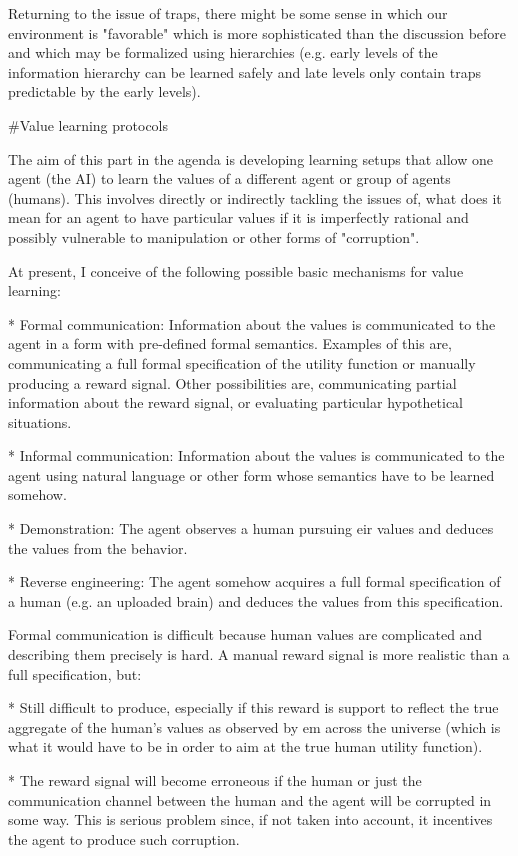 \documentclass[a4paper]{article}
\begin{document}
Returning to the issue of traps, there might be some sense in which our environment is "favorable" which is more sophisticated than the discussion before and which may be formalized using hierarchies (e.g. early levels of the information hierarchy can be learned safely and late levels only contain traps predictable by the early levels).

\#Value learning protocols

The aim of this part in the agenda is developing learning setups that allow one agent (the AI) to learn the values of a different agent or group of agents (humans). This involves directly or indirectly tackling the issues of, what does it mean for an agent to have particular values if it is imperfectly rational and possibly vulnerable to manipulation or other forms of "corruption".

At present, I conceive of the following possible basic mechanisms for value learning:

* Formal communication: Information about the values is communicated to the agent in a form with pre-defined formal semantics. Examples of this are, communicating a full formal specification of the utility function or manually producing a reward signal. Other possibilities are, communicating partial information about the reward signal, or evaluating particular hypothetical situations.

* Informal communication: Information about the values is communicated to the agent using natural language or other form whose semantics have to be learned somehow.

* Demonstration: The agent observes a human pursuing eir values and deduces the values from the behavior.

* Reverse engineering: The agent somehow acquires a full formal specification of a human (e.g. an uploaded brain) and deduces the values from this specification.

Formal communication is difficult because human values are complicated and describing them precisely is hard. A manual reward signal is more realistic than a full specification, but:

* Still difficult to produce, especially if this reward is support to reflect the true aggregate of the human's values as observed by em across the universe (which is what it would have to be in order to aim at the true human utility function).

* The reward signal will become erroneous if the human or just the communication channel between the human and the agent will be corrupted in some way. This is serious problem since, if not taken into account, it incentives the agent to produce such corruption.
\end{document}
